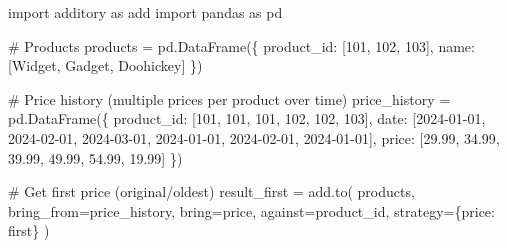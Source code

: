 \documentclass[
  letterpaper,
]{scrbook}
\newenvironment{Shaded}{\begin{snugshade}}{\end{snugshade}}
\newcommand{\CommentTok}[1]{\textcolor[rgb]{0.37,0.37,0.37}{#1}}
\newcommand{\DecValTok}[1]{\textcolor[rgb]{0.68,0.00,0.00}{#1}}
\newcommand{\FloatTok}[1]{\textcolor[rgb]{0.68,0.00,0.00}{#1}}
\newcommand{\ImportTok}[1]{\textcolor[rgb]{0.00,0.46,0.62}{#1}}
\newcommand{\NormalTok}[1]{\textcolor[rgb]{0.00,0.23,0.31}{#1}}
\newcommand{\OperatorTok}[1]{\textcolor[rgb]{0.37,0.37,0.37}{#1}}
\newcommand{\StringTok}[1]{\textcolor[rgb]{0.13,0.47,0.30}{#1}}
\begin{document}
\begin{Shaded}
\begin{Highlighting}[]
\ImportTok{import}\NormalTok{ additory }\ImportTok{as}\NormalTok{ add}
\ImportTok{import}\NormalTok{ pandas }\ImportTok{as}\NormalTok{ pd}

\CommentTok{\# Products}
\NormalTok{products }\OperatorTok{=}\NormalTok{ pd.DataFrame(\{}
    \StringTok{\textquotesingle{}product\_id\textquotesingle{}}\NormalTok{: [}\DecValTok{101}\NormalTok{, }\DecValTok{102}\NormalTok{, }\DecValTok{103}\NormalTok{],}
    \StringTok{\textquotesingle{}name\textquotesingle{}}\NormalTok{: [}\StringTok{\textquotesingle{}Widget\textquotesingle{}}\NormalTok{, }\StringTok{\textquotesingle{}Gadget\textquotesingle{}}\NormalTok{, }\StringTok{\textquotesingle{}Doohickey\textquotesingle{}}\NormalTok{]}
\NormalTok{\})}

\CommentTok{\# Price history (multiple prices per product over time)}
\NormalTok{price\_history }\OperatorTok{=}\NormalTok{ pd.DataFrame(\{}
    \StringTok{\textquotesingle{}product\_id\textquotesingle{}}\NormalTok{: [}\DecValTok{101}\NormalTok{, }\DecValTok{101}\NormalTok{, }\DecValTok{101}\NormalTok{, }\DecValTok{102}\NormalTok{, }\DecValTok{102}\NormalTok{, }\DecValTok{103}\NormalTok{],}
    \StringTok{\textquotesingle{}date\textquotesingle{}}\NormalTok{: [}\StringTok{\textquotesingle{}2024{-}01{-}01\textquotesingle{}}\NormalTok{, }\StringTok{\textquotesingle{}2024{-}02{-}01\textquotesingle{}}\NormalTok{, }\StringTok{\textquotesingle{}2024{-}03{-}01\textquotesingle{}}\NormalTok{, }
             \StringTok{\textquotesingle{}2024{-}01{-}01\textquotesingle{}}\NormalTok{, }\StringTok{\textquotesingle{}2024{-}02{-}01\textquotesingle{}}\NormalTok{, }\StringTok{\textquotesingle{}2024{-}01{-}01\textquotesingle{}}\NormalTok{],}
    \StringTok{\textquotesingle{}price\textquotesingle{}}\NormalTok{: [}\FloatTok{29.99}\NormalTok{, }\FloatTok{34.99}\NormalTok{, }\FloatTok{39.99}\NormalTok{, }\FloatTok{49.99}\NormalTok{, }\FloatTok{54.99}\NormalTok{, }\FloatTok{19.99}\NormalTok{]}
\NormalTok{\})}

\CommentTok{\# Get first price (original/oldest)}
\NormalTok{result\_first }\OperatorTok{=}\NormalTok{ add.to(}
\NormalTok{    products,}
\NormalTok{    bring\_from}\OperatorTok{=}\NormalTok{price\_history,}
\NormalTok{    bring}\OperatorTok{=}\StringTok{\textquotesingle{}price\textquotesingle{}}\NormalTok{,}
\NormalTok{    against}\OperatorTok{=}\StringTok{\textquotesingle{}product\_id\textquotesingle{}}\NormalTok{,}
\NormalTok{    strategy}\OperatorTok{=}\NormalTok{\{}\StringTok{\textquotesingle{}price\textquotesingle{}}\NormalTok{: }\StringTok{\textquotesingle{}first\textquotesingle{}}\NormalTok{\}}
\NormalTok{)}


\end{Highlighting}
\end{Shaded}
\end{document}
